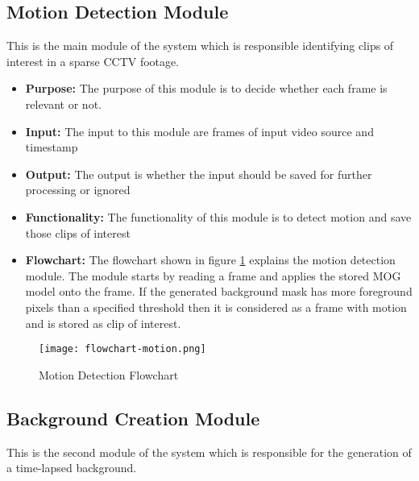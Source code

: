     \subsection{Motion Detection Module}
    This is the main module of the system which is responsible identifying clips
    of interest in a sparse CCTV footage.

    \begin{itemize}
        \item \textbf{Purpose:} The purpose of this module is to decide whether
        each frame is relevant or not.
        \item \textbf{Input:} The input to this module are frames of input video
        source and timestamp
        \item \textbf{Output:} The output is whether the input should be saved
        for further processing or ignored
        \item \textbf{Functionality:} The functionality of this module is to
        detect motion and save those clips of interest
        \item \textbf{Flowchart:} The flowchart shown in figure
        \ref{img:flowchart-motion} explains the motion detection module. The
        module starts by reading a frame and applies the stored MOG model onto
        the frame. If the generated background mask has more foreground pixels
        than a specified threshold then it is considered as a frame with motion
        and is stored as clip of interest.
    \end{itemize}

    \begin{figure}[H]
        \centering
        \texttt{[image: flowchart-motion.png]}
        \caption{Motion Detection Flowchart}
        \label{img:flowchart-motion}
    \end{figure}


    \subsection{Background Creation Module}
    This is the second module of the system which is responsible for the
    generation of a time-lapsed background.

